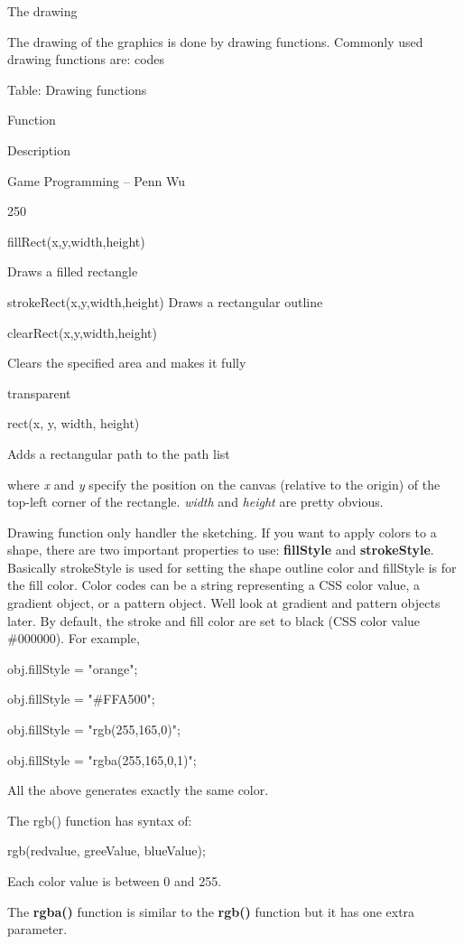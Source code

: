 \documentclass[
]{article}
\begin{document}
The drawing

The drawing of the graphics is done by drawing functions. Commonly used
drawing functions are: codes

Table: Drawing functions

Function

Description

Game Programming -- Penn Wu

250

\protect\hypertarget{index_split_013.htmlux5cux23p251}{}{}fillRect(x,y,width,height)

Draws a filled rectangle

strokeRect(x,y,width,height) Draws a rectangular outline

clearRect(x,y,width,height)

Clears the specified area and makes it fully

transparent

rect(x, y, width, height)

Adds a rectangular path to the path list

where \emph{x} and \emph{y} specify the position on the canvas (relative
to the origin) of the top-left corner of the rectangle. \emph{width} and
\emph{height} are pretty obvious.

Drawing function only handler the sketching. If you want to apply colors
to a shape, there are two important properties to use:
\textbf{fillStyle} and \textbf{strokeStyle}. Basically strokeStyle is
used for setting the shape outline color and fillStyle is for the fill
color. Color codes can be a string representing a CSS color value, a
gradient object, or a pattern object. We\textquotesingle ll look at
gradient and pattern objects later. By default, the stroke and fill
color are set to black (CSS color value \#000000). For example,

obj.fillStyle = "orange";

obj.fillStyle = "\#FFA500";

obj.fillStyle = "rgb(255,165,0)";

obj.fillStyle = "rgba(255,165,0,1)";

All the above generates exactly the same color.

The rgb() function has syntax of:

rgb(redvalue, greeValue, blueValue);

Each color value is between 0 and 255.

The \textbf{rgba()} function is similar to the \textbf{rgb()} function
but it has one extra parameter.
\end{document}
